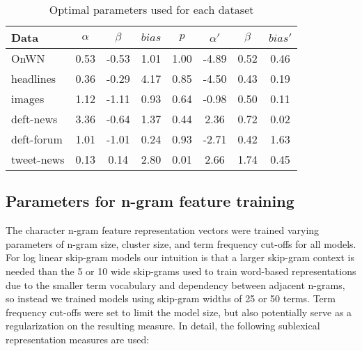 \begin{table}[t!]
\begin{tabular}{|l|ccccccc|}
\hline 
{\scriptsize\bf Data} & {\footnotesize $\alpha$} & {\footnotesize $\beta$} & {\footnotesize $bias$} & {\footnotesize $p$} & {\footnotesize $\alpha'$} & {\footnotesize $\beta$} & {\footnotesize $bias'$}\tabularnewline
\hline 
{\scriptsize OnWN} & {\scriptsize 0.53} & {\scriptsize -0.53} & {\scriptsize 1.01} & {\scriptsize 1.00} & {\scriptsize -4.89} & {\scriptsize 0.52} & {\scriptsize 0.46}\tabularnewline
{\scriptsize headlines} & {\scriptsize 0.36} & {\scriptsize -0.29} & {\scriptsize 4.17} & {\scriptsize 0.85} & {\scriptsize -4.50} & {\scriptsize 0.43} & {\scriptsize 0.19}\tabularnewline
{\scriptsize images} & {\scriptsize 1.12} & {\scriptsize -1.11} & {\scriptsize 0.93} & {\scriptsize 0.64} & {\scriptsize -0.98} & {\scriptsize 0.50} & {\scriptsize 0.11}\tabularnewline
{\scriptsize deft-news} & {\scriptsize 3.36} & {\scriptsize -0.64} & {\scriptsize 1.37} & {\scriptsize 0.44} & {\scriptsize 2.36} & {\scriptsize 0.72} & {\scriptsize 0.02}\tabularnewline
{\scriptsize deft-forum} & {\scriptsize 1.01} & {\scriptsize -1.01} & {\scriptsize 0.24} & {\scriptsize 0.93} & {\scriptsize -2.71} & {\scriptsize 0.42} & {\scriptsize 1.63}\tabularnewline
{\scriptsize tweet-news} & {\scriptsize 0.13} & {\scriptsize 0.14} & {\scriptsize 2.80} & {\scriptsize 0.01} & {\scriptsize 2.66} & {\scriptsize 1.74} & {\scriptsize 0.45}\tabularnewline
\hline 
\end{tabular}\caption{Optimal parameters used for each dataset\label{tab:Optimal-parameters}}
\end{table}

\subsection{Parameters for n-gram feature training}
\label{ngram-optimisation}

The character n-gram feature representation vectors were trained varying parameters of 
n-gram size, cluster size, and term frequency cut-offs for all models.
For log linear skip-gram models our intuition is that a larger skip-gram context is needed than the 5 or 10 wide skip-grams 
used to train word-based representations due to the smaller term vocabulary and dependency between adjacent n-grams,
so instead we trained models using skip-gram widths of 25 or 50 terms. 
Term frequency cut-offs were set to limit the model size, but also potentially serve as a regularization on the resulting measure.
%
In detail, the following sublexical representation measures are used:

